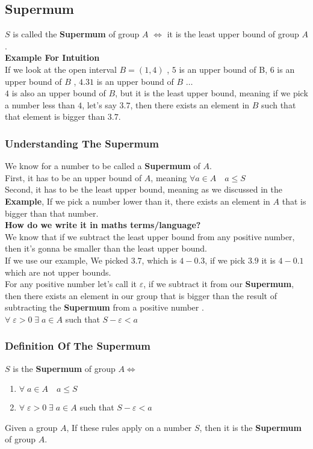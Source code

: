 \subsection{Supermum}
$S$ is called the \textbf{Supermum} of group $A$ $\iff$ it is the least upper bound of group $A$.\\
\textbf{Example For Intuition}\\
If we look at the open interval $B= (1,4)$ , $5$ is an upper bound of B, $6$ is an upper bound of $B$ , $4.31$ is an upper bound of $B$ $\ldots$\\
$4$ is also an upper bound of $B$, but it is the least upper bound, meaning if we pick a number less than $4$, let's say $3.7$, then there exists an element in $B$ such that that element is bigger than $3.7$.\\
\subsubsection{Understanding The Supermum}
We know for a number to be called a \textbf{Supermum} of $A$.\\
First, it has to be an upper bound of $A$, meaning $\forall a\in A\quad a\leq S$\\
Second, it has to be the least upper bound, meaning as we discussed in the \textbf{Example}, If we pick a number lower than it, there exists an element in $A$ that is bigger than that number.\\
\textbf{How do we write it in maths terms/language?}\\
We know that if we subtract the least upper bound from any positive number, then it's gonna be smaller than the least upper bound.\\
If we use our example, We picked $3.7$, which is $4-0.3$, if we pick $3.9$ it is $4-0.1$ which are not upper bounds.\\
For any positive number let's call it $\varepsilon$, if we subtract it from our \textbf{Supermum}, then there exists an element in our group that is bigger than the result of subtracting the \textbf{Supermum} from a positive number .\\
$\forall\; \varepsilon > 0 \; \exists \; a\in A$ such that \; $S-\varepsilon < a$\\

\subsubsection{Definition Of The Supermum}
$S$ is the \textbf{Supermum} of group $A \iff$\\
\begin{enumerate}
    \item $\forall\; a\in A \quad a\leq S$
    \item $\forall\; \varepsilon > 0 \; \exists\; a\in A$ such that $S-\varepsilon<a$
\end{enumerate}
Given a group $A$, If these rules apply on a number $S$, then it is the \textbf{Supermum} of group $A$.\\

